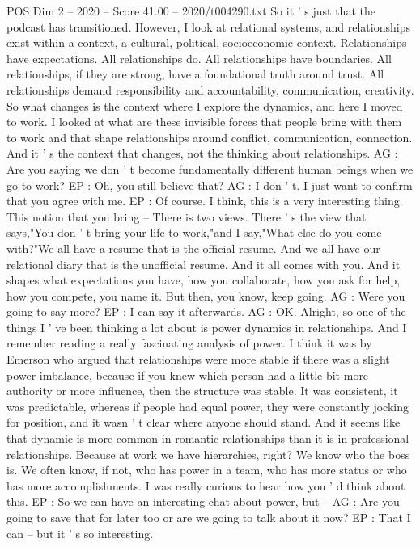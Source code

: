 \begin{textsample}{POS Dim 2 – 2020 – Score 41.00 – 2020/t004290.txt}
So it ' s just that the podcast has transitioned.
However, I look at relational systems, and relationships exist within a context, a cultural, political, socioeconomic context.
Relationships have expectations.
All relationships do.
All relationships have boundaries.
All relationships, if they are strong, have a foundational truth around trust.
All relationships demand responsibility and accountability, communication, creativity.
So what changes is the context where I explore the dynamics, and here I moved to work.
I looked at what are these invisible forces that people bring with them to work and that shape relationships around conflict, communication, connection.
And it ' s the context that changes, not the thinking about relationships.
AG : Are you saying we don ' t become fundamentally different human beings when we go to work?
EP : Oh, you still believe that?
AG : I don ' t.
I just want to confirm that you agree with me.
EP : Of course.
I think, this is a very interesting thing.
This notion that you bring -- There is two views.
There ' s the view that says,"You don ' t bring your life to work,"and I say,"What else do you come with?"We all have a resume that is the official resume.
And we all have our relational diary that is the unofficial resume.
And it all comes with you.
And it shapes what expectations you have, how you collaborate, how you ask for help, how you compete, you name it.
But then, you know, keep going.
AG : Were you going to say more?
EP : I can say it afterwards.
AG : OK.
Alright, so one of the things I ' ve been thinking a lot about is power dynamics in relationships.
And I remember reading a really fascinating analysis of power.
I think it was by Emerson who argued that relationships were more stable if there was a slight power imbalance, because if you knew which person had a little bit more authority or more influence, then the structure was stable.
It was consistent, it was predictable, whereas if people had equal power, they were constantly jocking for position, and it wasn ' t clear where anyone should stand.
And it seems like that dynamic is more common in romantic relationships than it is in professional relationships.
Because at work we have hierarchies, right?
We know who the boss is.
We often know, if not, who has power in a team, who has more status or who has more accomplishments.
I was really curious to hear how you ' d think about this.
EP : So we can have an interesting chat about power, but -- AG : Are you going to save that for later too or are we going to talk about it now?
EP : That I can -- but it ' s so interesting.

\end{textsample}
